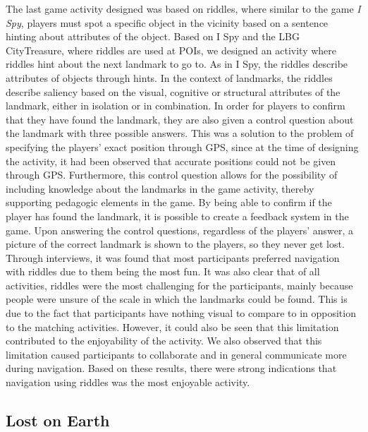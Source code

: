 The last game activity designed was based on riddles, where similar to the game \textit{I Spy}\cite{childrensGames}, players must spot a specific object in the vicinity based on a sentence hinting about attributes of the object. Based on I Spy and the LBG CityTreasure, where riddles are used at POIs, we designed an activity where riddles hint about the next landmark to go to. As in I Spy, the riddles describe attributes of objects through hints. In the context of landmarks, the riddles describe saliency based on the visual, cognitive or structural attributes of the landmark, either in isolation or in combination. In order for players to confirm that they have found the landmark, they are also given a control question about the landmark with three possible answers. This was a solution to the problem of specifying the players' exact position through GPS, since at the time of designing the activity, it had been observed that accurate positions could not be given through GPS. Furthermore, this control question allows for the possibility of including knowledge about the landmarks in the game activity, thereby supporting pedagogic elements in the game. By being able to confirm if the player has found the landmark, it is possible to create a feedback system in the game. Upon answering the control questions, regardless of the players' answer, a picture of the correct landmark is shown to the players, so they never get lost. Through interviews, it was found that most participants preferred navigation with riddles due to them being the most fun. It was also clear that of all activities, riddles were the most challenging for the participants, mainly because people were unsure of the scale in which the landmarks could be found. This is due to the fact that participants have nothing visual to compare to in opposition to the matching activities. However, it could also be seen that this limitation contributed to the enjoyability of the activity. We also observed that this limitation caused participants to collaborate and in general communicate more during navigation. Based on these results, there were strong indications that navigation using riddles was the most enjoyable activity.

\subsection{Lost on Earth}
